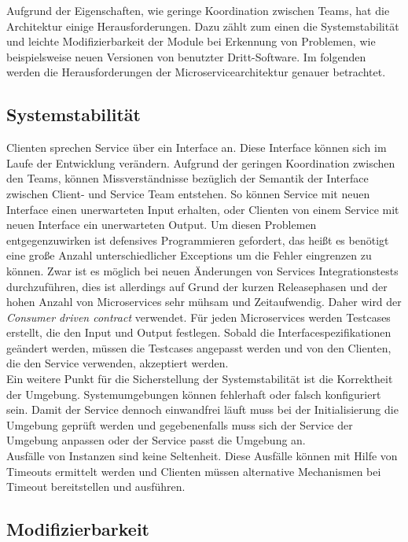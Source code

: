 Aufgrund der Eigenschaften, wie geringe Koordination zwischen Teams, hat die Architektur einige Herausforderungen. Dazu zählt zum einen die Systemstabilität und leichte Modifizierbarkeit der Module bei Erkennung von Problemen, wie beispielsweise neuen Versionen von benutzter Dritt-Software. Im folgenden werden die Herausforderungen der Microservicearchitektur genauer betrachtet.

\subsection{Systemstabilität}

Clienten sprechen Service über ein Interface an. Diese Interface können sich im Laufe der Entwicklung verändern. Aufgrund der geringen Koordination zwischen den Teams, können Missverständnisse bezüglich der Semantik der Interface zwischen Client- und Service Team entstehen. So können Service mit neuen Interface einen unerwarteten Input erhalten, oder Clienten von einem Service mit neuen Interface ein unerwarteten Output. Um diesen Problemen entgegenzuwirken ist defensives Programmieren gefordert, das heißt es benötigt eine große Anzahl unterschiedlicher Exceptions um die Fehler eingrenzen zu können. Zwar ist es möglich bei neuen Änderungen von Services Integrationstests durchzuführen, dies ist allerdings auf Grund der kurzen Releasephasen und der hohen Anzahl von Microservices sehr mühsam und Zeitaufwendig. Daher wird der \textit{Consumer driven contract} verwendet. Für jeden Microservices werden Testcases erstellt, die den Input und Output festlegen. Sobald die Interfacespezifikationen geändert werden, müssen die Testcases angepasst werden und von den Clienten, die den Service verwenden, akzeptiert werden. \\
Ein weitere Punkt für die Sicherstellung der Systemstabilität ist die Korrektheit der Umgebung. Systemumgebungen können fehlerhaft oder falsch konfiguriert sein. Damit der Service dennoch einwandfrei läuft muss bei der Initialisierung die Umgebung geprüft werden und gegebenenfalls muss sich der Service der Umgebung anpassen oder der Service passt die Umgebung an.\\
Ausfälle von Instanzen sind keine Seltenheit. Diese Ausfälle können mit Hilfe von Timeouts ermittelt werden und Clienten müssen alternative Mechanismen bei Timeout bereitstellen und ausführen. 

\subsection{Modifizierbarkeit}

